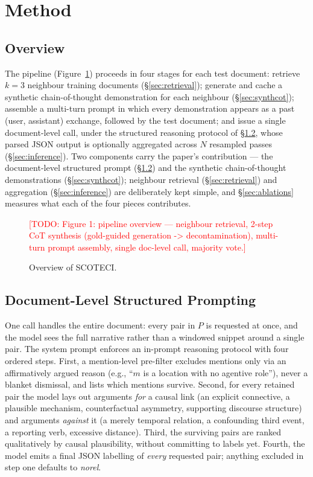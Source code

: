 \documentclass[11pt]{article}
\newcommand{\todo}[1]{\textcolor{red}{[TODO: #1]}}
\newcommand{\method}{SCOTECI}
\begin{document}
\section{Method}
\label{sec:method}

\subsection{Overview}
The pipeline (Figure~\ref{fig:overview}) proceeds in four stages for each test
document: retrieve $k=3$ neighbour training documents (\S\ref{sec:retrieval});
generate and cache a synthetic chain-of-thought demonstration for each neighbour
(\S\ref{sec:synthcot}); assemble a multi-turn prompt in which every demonstration
appears as a past (user, assistant) exchange, followed by the test document; and
issue a single document-level call, under the structured reasoning protocol of
\S\ref{sec:docprompt}, whose parsed JSON output is optionally aggregated across $N$
resampled passes (\S\ref{sec:inference}). Two components carry the paper's
contribution --- the document-level structured prompt (\S\ref{sec:docprompt}) and
the synthetic chain-of-thought demonstrations (\S\ref{sec:synthcot}); neighbour
retrieval (\S\ref{sec:retrieval}) and aggregation (\S\ref{sec:inference}) are
deliberately kept simple, and \S\ref{sec:ablations} measures what each of the four
pieces contributes.

\begin{figure}[t]
  \centering
  \todo{Figure 1: pipeline overview --- neighbour retrieval, 2-step CoT
  synthesis (gold-guided generation -> decontamination), multi-turn prompt
  assembly, single doc-level call, majority vote.}
  \caption{Overview of \method{}.}
  \label{fig:overview}
\end{figure}

\subsection{Document-Level Structured Prompting}
\label{sec:docprompt}
One call handles the entire document: every pair in $P$ is requested at once, and
the model sees the full narrative rather than a windowed snippet around a single
pair. The system prompt enforces an in-prompt reasoning protocol with four ordered
steps. First, a mention-level pre-filter excludes mentions only via an
affirmatively argued reason (e.g., ``$m$ is a location with no agentive role''),
never a blanket dismissal, and lists which mentions survive. Second, for every
retained pair the model lays out arguments \emph{for} a causal link (an explicit
connective, a plausible mechanism, counterfactual asymmetry, supporting discourse
structure) and arguments \emph{against} it (a merely temporal relation, a
confounding third event, a reporting verb, excessive distance). Third, the
surviving pairs are ranked qualitatively by causal plausibility, without committing
to labels yet. Fourth, the model emits a final JSON labelling of \emph{every}
requested pair; anything excluded in step one defaults to \textit{norel}.
\end{document}
